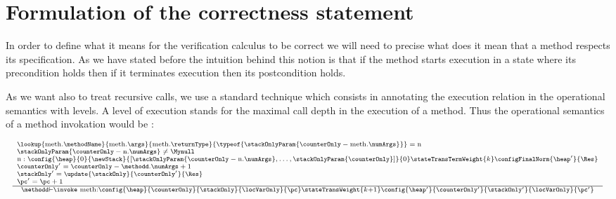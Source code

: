 \newtheorem{defCorrect}{Definition}[section]
\newtheorem{vcGenCorrect}{Theorem}[section]

\section{Formulation of the correctness statement}\label{proof:defineCorrect}

In order to define what it means for the verification calculus to be correct we will need to 
 precise what does it mean that a  method respects its specification. As we have stated 
 before the intuition behind this notion is that if the method starts execution in a state 
 where its precondition  holds then if it terminates execution then its postcondition holds.
  
 As we want also to treat recursive calls, we use a standard technique which consists in  annotating the execution 
relation in  the operational semantics with levels. A level of execution  stands for  the maximal call depth in the execution of a  method. 
  Thus the operational semantics of a method invokation would be :
 
$$ \begin{array}{l}
              {\scriptsize \frac{\begin{array}{l} 
                        \lookup{\mbox{\rm meth}.\methodName}{ \mbox{\rm meth}.\args  }{\mbox{\rm meth}.\returnType }{\typeof{ \stackOnlyParam{ \counterOnly - \mbox{\rm meth}.\numArgs }} } = \mbox{\rm n} \\
	                        \stackOnlyParam{ \counterOnly - \mbox{\rm n}.\numArgs } \neq \Mynull   \\
	                      \mbox{\rm n}  :         \config{\heap}       
                                                       {0}
						       {\newStack }
                                                       {\lbrack \stackOnlyParam{ \counterOnly - \mbox{\rm n}.\numArgs },\ldots ,\stackOnlyParam{ \counterOnly} \rbrack }
						       {0} 
						       \stateTransTermWeight{k}
						       \configFinalNorm{\heap'}{\Res}\\
				                       \counterOnly' = \counterOnly - \methodd.\numArgs + 1 \\
						       \stackOnly' = \update{\stackOnly}{\counterOnly'}{\Res} \\
						       \pc' = \pc + 1
			         \end{array}  }	         
	         {\methodd \vdash \invoke \  \mbox{\rm meth} :  \config{\heap}{\counterOnly}{\stackOnly}{\locVarOnly}{\pc} 
		                        \stateTransWeight{k + 1}
					\config{\heap' }{\counterOnly'}{\stackOnly' }{\locVarOnly}{\pc'}} }
\end{array}$$


